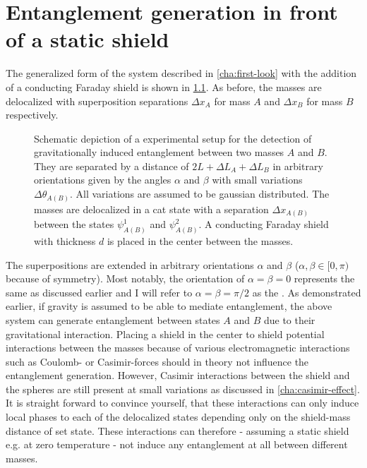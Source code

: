 \chapter{Entanglement generation in front of a static shield}\label{cha:entanglement-generation}

The generalized form of the system described in \cref{cha:first-look} with the addition of a conducting Faraday shield is shown in \cref{fig:4:complete-setup}. As before, the masses are delocalized with superposition separations $\Delta x_A$ for mass $A$ and $\Delta x_B$ for mass $B$ respectively.
\begin{figure}[!htbp]
  \centering
  \def\svgwidth{\textwidth}
  
  \caption{Schematic depiction of a experimental setup for the detection of gravitationally induced entanglement between two masses $A$ and $B$. They are separated by a distance of $2L + \Delta L_A + \Delta L_B$ in arbitrary orientations given by the angles $\alpha$ and $\beta$ with small variations $\Delta \theta_{A(B)}$. All variations are assumed to be gaussian distributed. The masses are delocalized in a cat state with a separation $\Delta x_{A(B)}$ between the states $\psi_{A(B)}^1$ and $\psi_{A(B)}^2$. A conducting Faraday shield with thickness $d$ is placed in the center between the masses.}
  \label{fig:4:complete-setup}
\end{figure}
The superpositions are extended in arbitrary orientations $\alpha$ and $\beta$ ($\alpha, \beta \in [0, \pi)$ because of symmetry). Most notably, the orientation of $\alpha = \beta = 0$ represents the same  as discussed earlier and I will refer to $\alpha = \beta = \pi/2$ as the .
As demonstrated earlier, if gravity is assumed to be able to mediate entanglement, the above system can generate entanglement between states $A$ and $B$ due to their gravitational interaction.
Placing a shield in the center to shield potential interactions between the masses because of various electromagnetic interactions such as Coulomb- or Casimir-forces should in theory not influence the entanglement generation. 
However, Casimir interactions between the shield and the spheres are still present at small variations as discussed in \cref{cha:casimir-effect}.
It is straight forward to convince yourself, that these interactions can only induce local phases to each of the delocalized states depending only on the shield-mass distance of set state. 
These interactions can therefore - assuming a static shield e.g. at zero temperature - not induce any entanglement at all between different masses.


